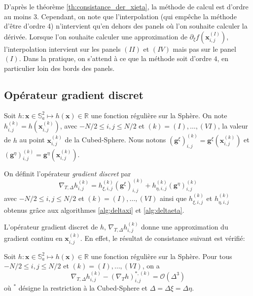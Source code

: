 D'après le théorème \ref{th:consistance_der_xieta}, la méthode de calcul est d'ordre au moins 3. Cependant, on note que l'interpolation (qui empêche la méthode d'être d'ordre 4) n'intervient qu'en dehors des panels où l'on souhaite calculer la dérivée.
Lorsque l'on souhaite calculer une approximation de $\partial_{\xi}f(\mathbf{x}_{i,j}^{(I)})$, l'interpolation intervient sur les panels $(II)$ et $(IV)$ mais pas sur le panel $(I)$. Dans la pratique, on s'attend à ce que la méthode soit d'ordre $4$, en particulier loin des bords des panels.









\subsection{Opérateur gradient discret}

Soit $h : \mathbf{x} \in \mathbb{S}_a^2 \mapsto h(\mathbf{x}) \in \mathbb{R}$ une fonction régulière sur la Sphère. On note $h_{i,j}^{(k)} = h(\mathbf{x}_{i,j}^{(k)})$, avec $-N/2 \leq i,j \leq N/2$ et $(k) = (I) , \ldots , (VI)$, la valeur de $h$ au point $\mathbf{x}_{i,j}^{(k)}$ de la Cubed-Sphere.
Nous notons $( \mathbf{g}^{\xi} )_{i,j}^{(k)} = \mathbf{g}^{\xi} (\mathbf{x}_{i,j}^{(k)})$ et $( \mathbf{g}^{\eta} )_{i,j}^{(k)} = \mathbf{g}^{\eta} (\mathbf{x}_{i,j}^{(k)})$.

\begin{definition}
On définit l'opérateur \textit{gradient discret} par 
\begin{equation}
\nabla_{T,\Delta} h_{i,j}^{(k)} = h_{\xi,i,j}^{(k)} ( \mathbf{g}^{\xi} )_{i,j}^{(k)} + h_{\eta,i,j}^{(k)} ( \mathbf{g}^{\eta} )_{i,j}^{(k)}
\end{equation}
avec $-N/2 \leq i,j \leq N/2$ et $(k) = (I), \ldots , (VI)$ ainsi que $h_{\xi,i,j}^{(k)}$ et $h_{\eta,i,j}^{(k)}$ obtenus grâce aux algorithmes \ref{alg:deltaxi} et \ref{alg:deltaeta}.
\label{def:gradient_disc}
\end{definition}
L'opérateur gradient discret de $h$, $\nabla_{T,\Delta} h_{i,j}^{(k)}$ donne une approximation du gradient continu en $\mathbf{x}_{i,j}^{(k)}$. En effet, le résultat de consistance suivant est vérifié:

\begin{proposition}
Soit $h : \mathbf{x} \in \mathbb{S}_a^2 \mapsto h(\mathbf{x}) \in \mathbb{R}$ une fonction régulière sur la Sphère. Pour tous $-N/2 \leq i,j \leq N/2$ et $(k)=(I), \ldots , (VI)$, on a
\begin{equation}
\nabla_{T,\Delta} h_{i,j}^{(k)} - (\nabla_T h)^{*,(k)}_{i,j} = \mathcal{O} \left( \Delta^3 \right)
\end{equation}
où $^*$ désigne la restriction à la Cubed-Sphere et $\Delta = \Delta \xi = \Delta \eta$. 
\label{prop:accuracy_gradient}
\end{proposition}


